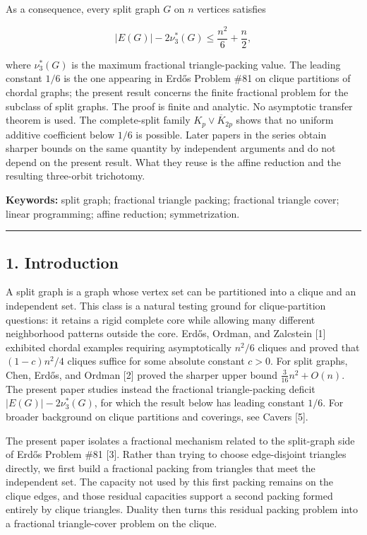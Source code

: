 \documentclass[
  american,
  11pt,
  a4paper,
]{article}
\begin{document}
As a consequence, every split graph \(G\) on \(n\) vertices satisfies

\[
\boxed{
|E(G)|-2\nu_3^*(G)\le \frac{n^2}{6}+\frac{n}{2},
}
\]

where \(\nu_3^*(G)\) is the maximum fractional triangle-packing value. The leading constant \(1/6\) is the one appearing in Erdős Problem \#81 on clique partitions of chordal graphs; the present result concerns the finite fractional problem for the subclass of split graphs. The proof is finite and analytic. No asymptotic transfer theorem is used. The complete-split family \(K_p\vee\overline{K}_{2p}\) shows that no uniform additive coefficient below \(1/6\) is possible. Later papers in the series obtain sharper bounds on the same quantity by independent arguments and do not depend on the present result. What they reuse is the affine reduction and the resulting three-orbit trichotomy.

\textbf{Keywords:} split graph; fractional triangle packing; fractional triangle cover; linear programming; affine reduction; symmetrization.

\begin{center}\rule{0.5\linewidth}{0.5pt}\end{center}

\subsection{1. Introduction}\label{introduction}

A split graph is a graph whose vertex set can be partitioned into a clique and an independent set. This class is a natural testing ground for clique-partition questions: it retains a rigid complete core while allowing many different neighborhood patterns outside the core. Erdős, Ordman, and Zalcstein {[}1{]} exhibited chordal examples requiring asymptotically \(n^2/6\) cliques and proved that \((1-c)n^2/4\) cliques suffice for some absolute constant \(c>0\). For split graphs, Chen, Erdős, and Ordman {[}2{]} proved the sharper upper bound \(\frac{3}{16}n^2+O(n)\). The present paper studies instead the fractional triangle-packing deficit \(|E(G)|-2\nu_3^*(G)\), for which the result below has leading constant \(1/6\). For broader background on clique partitions and coverings, see Cavers {[}5{]}.

The present paper isolates a fractional mechanism related to the split-graph side of Erdős Problem \#81 {[}3{]}. Rather than trying to choose edge-disjoint triangles directly, we first build a fractional packing from triangles that meet the independent set. The capacity not used by this first packing remains on the clique edges, and those residual capacities support a second packing formed entirely by clique triangles. Duality then turns this residual packing problem into a fractional triangle-cover problem on the clique.
\end{document}
